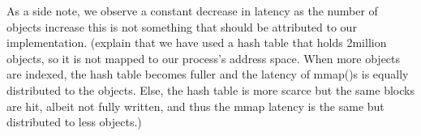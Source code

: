 
As a side note, we observe a constant decrease in latency as the number of 
objects increase this is not something that should be attributed to our 
implementation. (explain that we have used a hash table that holds 2million 
objects, so it is not mapped to our process's address space. When more objects 
are indexed, the hash table becomes fuller and the latency of mmap()s is 
equally distributed to the objects. Else, the hash table is more scarce but the 
same blocks are hit, albeit not fully written, and thus the mmap latency is the 
same but distributed to less objects.)
